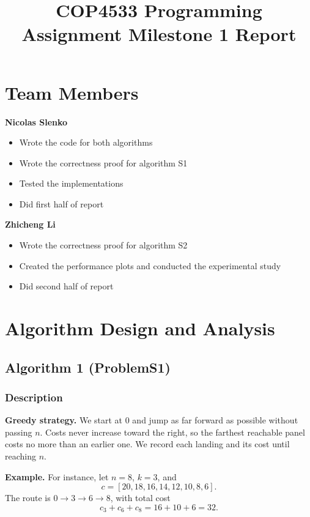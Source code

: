 \documentclass{article}
\begin{document}
\title{COP4533 Programming Assignment Milestone 1 Report}
\date{}
\maketitle

\section{Team Members}

\noindent\textbf{Nicolas Slenko}
\begin{itemize}
    \item Wrote the code for both algorithms
    \item Wrote the correctness proof for algorithm S1
    \item Tested the implementations
    \item Did first half of report
\end{itemize}

\noindent\textbf{Zhicheng Li}
\begin{itemize}
    \item Wrote the correctness proof for algorithm S2
    \item Created the performance plots and conducted the experimental study
    \item Did second half of report
\end{itemize}

\section{Algorithm Design and Analysis}

\subsection{Algorithm 1 (ProblemS1)}

\subsubsection{Description}

\noindent\textbf{Greedy strategy.} We start at $0$ and jump as far forward as possible without passing $n$. Costs never increase toward the right, so the farthest reachable panel costs no more than an earlier one. We record each landing and its cost until reaching $n$.

\medskip
\noindent\textbf{Example.} For instance, let $n=8$, $k=3$, and
\[
c=[20,18,16,14,12,10,8,6].
\]
The route is $0\to3\to6\to8$, with total cost
\[
c_3+c_6+c_8=16+10+6=32.
\]
\end{document}
